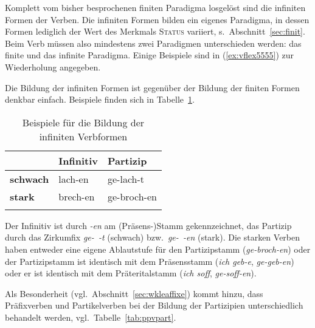 Komplett vom bisher besprochenen finiten Paradigma losgelöst sind die infiniten Formen der Verben.
Die infiniten Formen bilden ein eigenes Paradigma, in dessen Formen lediglich der Wert des Merkmals \textsc{Status} variiert, s.\ Abschnitt~\ref{sec:finit}.
Beim Verb müssen also mindestens zwei Paradigmen unterschieden werden: das finite und das infinite Paradigma.
Einige Beispiele sind in (\ref{ex:vflex5555}) zur Wiederholung angegeben.

\begin{exe}
  \ex\label{ex:vflex5555}
  \begin{xlist}
  \end{xlist}
\end{exe}

Die Bildung der infiniten Formen ist gegenüber der Bildung der finiten Formen denkbar einfach.
Beispiele finden sich in Tabelle~\ref{tab:vinf-bsp}.


\begin{table}
  \centering
  \begin{tabular}{lll}
    \lsptoprule
    & \textbf{Infinitiv} & \textbf{Partizip} \\
    \midrule
    \textbf{schwach} & lach-en & ge-lach-t\\
    \textbf{stark} & brech-en & ge-broch-en\\
    \lspbottomrule
  \end{tabular}
  \caption{Beispiele für die Bildung der infiniten Verbformen}
  \label{tab:vinf-bsp}
\end{table}

Der Infinitiv ist durch \textit{-en} am (Präsens-)Stamm gekennzeichnet, das Partizip durch das Zirkumfix \textit{ge-~-t} (schwach) bzw.\ \textit{ge-~-en} (stark).
Die starken Verben haben entweder eine eigene Ablautstufe für den Partizipstamm (\textit{ge-broch-en}) oder der Partizipstamm ist identisch mit dem Präsensstamm (\textit{ich geb-e}, \textit{ge-geb-en}) oder er ist identisch mit dem Präteritalstamm (\textit{ich soff}, \textit{ge-soff-en}).

Als Besonderheit (vgl.\ Abschnitt~\ref{sec:wkleaffixe}) kommt hinzu, dass Präfixverben und Partikelverben bei der Bildung der Partizipien unterschiedlich behandelt werden, vgl.\ Tabelle~\ref{tab:ppvpart}.



